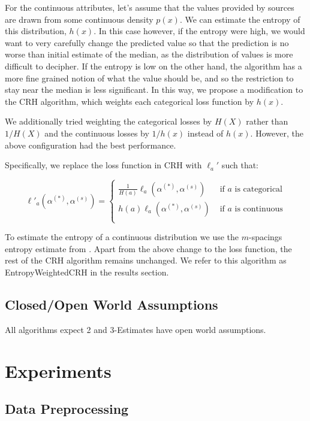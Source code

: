 \documentclass{acm_proc_article-sp}
\begin{document}
For the continuous attributes, let's assume that the values provided by sources are drawn from some continuous density $p(x)$. We can estimate the entropy of this distribution, $h(x)$. In this case however, if the entropy were high, we would want to very carefully change the predicted value so that the prediction is no worse than initial estimate of the median, as the distribution of values is more difficult to decipher. If the entropy is low on the other hand, the algorithm has a more fine grained notion of what the value should be, and so the restriction to stay near the median is less significant. In this way, we propose a modification to the CRH algorithm, which weights each categorical loss function by $h(x)$.

We additionally tried weighting the categorical losses by $H(X)$ rather than $1/H(X)$ and the continuous losses  by $1/h(x)$ instead of $h(x)$. However, the above configuration had the best performance. 

Specifically, we replace the loss function in CRH with $\ell_a'$ such that: 

\begin{equation}
\ell'_a(\alpha^{(*)}, \alpha^{(s)}) = \left\{
     \begin{array}{lr}
       \frac{1}{H(a)} \ell_a(\alpha^{(*)}, \alpha^{(s)})  & \text{ if $a$ is categorical} \\
       h(a) \ell_a(\alpha^{(*)}, \alpha^{(s)})  & \text{ if $a$ is continuous} \\
     \end{array}
   \right.
\end{equation}


To estimate the entropy of a continuous distribution we use the $m$-spacings entropy estimate from \cite{learned2003ica}. Apart from the above change to the loss function, the rest of the CRH algorithm remains unchanged. We refer to this algorithm as {\sc EntropyWeightedCRH} in the results section. 

\subsection{Closed/Open World Assumptions}
All algorithms expect 2 and 3-Estimates have open world assumptions. 


\section{Experiments}

\subsection{Data Preprocessing}
\end{document}

